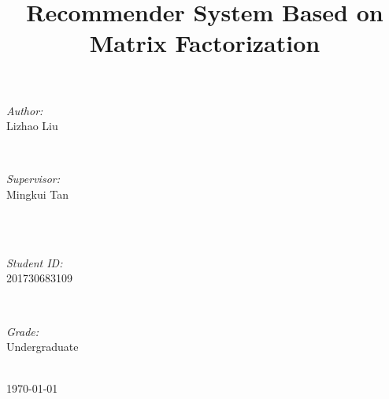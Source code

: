 \documentclass[journal, a4paper]{IEEEtran}
\begin{document}
\begin{titlepage}
\begin{minipage}{0.4\textwidth}
\begin{flushleft} \large
\emph{Author:}\\
Lizhao Liu %
\end{flushleft}
\end{minipage}
~
\begin{minipage}{0.4\textwidth}
\begin{flushright} \large
\emph{Supervisor:} \\
Mingkui Tan %
\end{flushright}
\end{minipage}\\[2cm]
~
\begin{minipage}{0.4\textwidth}
\begin{flushleft} \large
\emph{Student ID:}\\
201730683109
\end{flushleft}
\end{minipage}
~
\begin{minipage}{0.4\textwidth}
\begin{flushright} \large
\emph{Grade:} \\
Undergraduate
\end{flushright}
\end{minipage}\\[2cm]



{\large \today}\\[2cm] %

 

\vfill %

\end{titlepage}

	\title{Recommender System Based on Matrix Factorization}
	\maketitle
\end{document}
